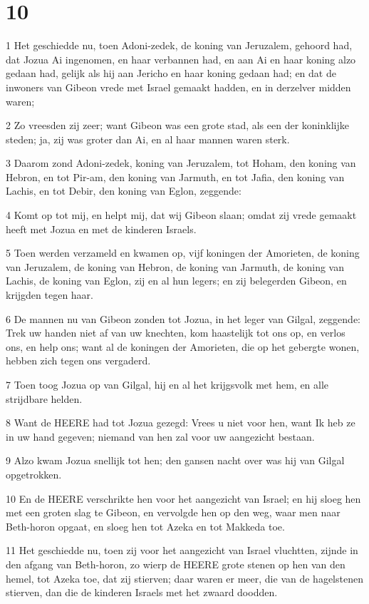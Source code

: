 \chapter{10}

\par 1 Het geschiedde nu, toen Adoni-zedek, de koning van Jeruzalem, gehoord had, dat Jozua Ai ingenomen, en haar verbannen had, en aan Ai en haar koning alzo gedaan had, gelijk als hij aan Jericho en haar koning gedaan had; en dat de inwoners van Gibeon vrede met Israel gemaakt hadden, en in derzelver midden waren;
\par 2 Zo vreesden zij zeer; want Gibeon was een grote stad, als een der koninklijke steden; ja, zij was groter dan Ai, en al haar mannen waren sterk.
\par 3 Daarom zond Adoni-zedek, koning van Jeruzalem, tot Hoham, den koning van Hebron, en tot Pir-am, den koning van Jarmuth, en tot Jafia, den koning van Lachis, en tot Debir, den koning van Eglon, zeggende:
\par 4 Komt op tot mij, en helpt mij, dat wij Gibeon slaan; omdat zij vrede gemaakt heeft met Jozua en met de kinderen Israels.
\par 5 Toen werden verzameld en kwamen op, vijf koningen der Amorieten, de koning van Jeruzalem, de koning van Hebron, de koning van Jarmuth, de koning van Lachis, de koning van Eglon, zij en al hun legers; en zij belegerden Gibeon, en krijgden tegen haar.
\par 6 De mannen nu van Gibeon zonden tot Jozua, in het leger van Gilgal, zeggende: Trek uw handen niet af van uw knechten, kom haastelijk tot ons op, en verlos ons, en help ons; want al de koningen der Amorieten, die op het gebergte wonen, hebben zich tegen ons vergaderd.
\par 7 Toen toog Jozua op van Gilgal, hij en al het krijgsvolk met hem, en alle strijdbare helden.
\par 8 Want de HEERE had tot Jozua gezegd: Vrees u niet voor hen, want Ik heb ze in uw hand gegeven; niemand van hen zal voor uw aangezicht bestaan.
\par 9 Alzo kwam Jozua snellijk tot hen; den gansen nacht over was hij van Gilgal opgetrokken.
\par 10 En de HEERE verschrikte hen voor het aangezicht van Israel; en hij sloeg hen met een groten slag te Gibeon, en vervolgde hen op den weg, waar men naar Beth-horon opgaat, en sloeg hen tot Azeka en tot Makkeda toe.
\par 11 Het geschiedde nu, toen zij voor het aangezicht van Israel vluchtten, zijnde in den afgang van Beth-horon, zo wierp de HEERE grote stenen op hen van den hemel, tot Azeka toe, dat zij stierven; daar waren er meer, die van de hagelstenen stierven, dan die de kinderen Israels met het zwaard doodden.
